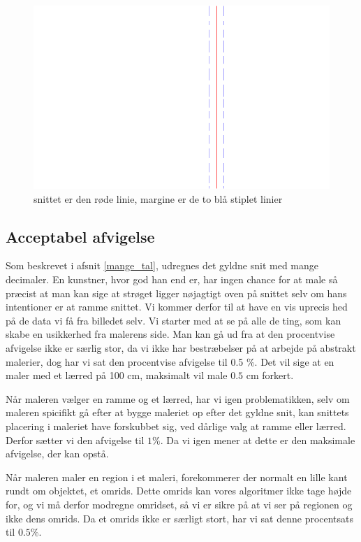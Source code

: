 \begin{figure}[h]
	\begin{center}
		\includegraphics[scale=0.30,angle=0]{afsnit/vores_implementation/billeder/naiv_algoritme/margin.png}
	\end{center}
	\caption[]{snittet er den røde linie, margine er de to blå stiplet linier}
	\label{margin}
\end{figure}

\subsection{Acceptabel afvigelse}
Som beskrevet i afsnit \ref{mange_tal}, udregnes
det gyldne snit med mange decimaler. En kunstner, hvor god han end er,
har ingen chance for at male så præcist at man kan sige at strøget
ligger nøjagtigt oven på snittet selv om hans intentioner er at ramme
snittet. Vi kommer derfor til at have en vis uprecis hed på de data vi
få fra billedet selv. Vi starter med at se på alle de ting, som kan
skabe en usikkerhed fra malerens side. Man kan gå ud fra at den
procentvise afvigelse ikke er særlig stor, da vi ikke har bestræbelser
på at arbejde på abstrakt malerier, dog har vi sat den procentvise
afvigelse til 0.5 \%. Det vil sige at en maler med et lærred på 100
cm, maksimalt vil male $0.5$ cm forkert.

Når maleren vælger en ramme og et lærred, har vi igen problematikken,
selv om maleren spicifikt gå efter at bygge maleriet op efter det gyldne
snit, kan snittets placering i maleriet have forskubbet sig, ved dårlige
valg at ramme eller lærred. Derfor sætter vi den afvigelse til $1\%$. Da
vi igen mener at dette er den maksimale afvigelse, der kan opstå.

Når maleren maler en region i et maleri, forekommerer der normalt en
lille kant rundt om objektet, et omrids. Dette omrids kan vores
algoritmer ikke tage højde for, og vi må derfor modregne omridset, så vi
er sikre på at vi ser på regionen og ikke dens omrids. Da et omrids ikke
er særligt stort, har vi sat denne procentsats til $0.5\%$. 

